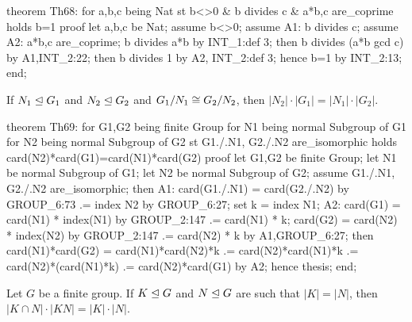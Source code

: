 \nwenddocs{}\endmoddef\nwstartdeflinemarkup{}\nwenddeflinemarkup
theorem Th68:
  for a,b,c being Nat
  st b<>0 & b divides c & a*b,c are_coprime
  holds b=1
proof
  let a,b,c be Nat;
  assume b<>0;
  assume A1: b divides c;
  assume A2: a*b,c are_coprime;
  b divides a*b by INT_1:def 3;
  then b divides (a*b gcd c) by A1,INT_2:22;
  then b divides 1 by A2, INT_2:def 3;
  hence b=1 by INT_2:13;
end;
\eatline
{}\nwendcode{}\nwdocspar
\begin{theorem}
If $N_{1}\trianglelefteq G_{1}$ and $N_{2}\trianglelefteq G_{2}$ and
$G_{1}/N_{1}\cong G_{2}/N_{2}$, then $|N_{2}|\cdot|G_{1}|=|N_{1}|\cdot|G_{2}|$.
\end{theorem}

\nwenddocs{}\endmoddef\nwstartdeflinemarkup{}\nwenddeflinemarkup
theorem Th69:
  for G1,G2 being finite Group
  for N1 being normal Subgroup of G1
  for N2 being normal Subgroup of G2
  st G1./.N1, G2./.N2 are_isomorphic
  holds card(N2)*card(G1)=card(N1)*card(G2)
proof
  let G1,G2 be finite Group;
  let N1 be normal Subgroup of G1;
  let N2 be normal Subgroup of G2;
  assume G1./.N1, G2./.N2 are_isomorphic;
  then A1: card(G1./.N1) = card(G2./.N2) by GROUP_6:73
                        .= index N2 by GROUP_6:27;
  set k = index N1;
  A2: card(G1) = card(N1) * index(N1) by GROUP_2:147
              .= card(N1) * k;
  card(G2) = card(N2) * index(N2) by GROUP_2:147
          .= card(N2) * k by A1,GROUP_6:27;
  then card(N1)*card(G2) = card(N1)*card(N2)*k
                        .= card(N2)*card(N1)*k
                        .= card(N2)*(card(N1)*k)
                        .= card(N2)*card(G1) by A2;
  hence thesis;
end;
\eatline
{}\nwendcode{}\nwdocspar
\begin{theorem}
Let $G$ be a finite group.
If $K\trianglelefteq G$ and $N\trianglelefteq G$ are such that $|K|=|N|$,
then $|K\cap N|\cdot|KN|=|K|\cdot|N|$.
\end{theorem}

